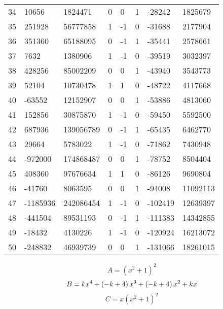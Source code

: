 \documentclass{amsart}
\begin{document}
\begin{longtable}{|l|l|l|lllll|}
34&10656&1824471&0&0&1&-28242&1825679\\
35&251928&56777858&1&-1&0&-31688&2177904\\
36&351360&65188095&0&-1&1&-35441&2578661\\
37&7632&1380906&1&-1&0&-39519&3032397\\
38&428256&85002209&0&0&1&-43940&3543773\\
39&52104&10730478&1&1&0&-48722&4117668\\
40&-63552&12152907&0&0&1&-53886&4813060\\
41&152856&30875870&1&-1&0&-59450&5592500\\
42&687936&139056789&0&-1&1&-65435&6462770\\
43&29664&5783022&1&-1&0&-71862&7430948\\
44&-972000&174868487&0&0&1&-78752&8504404\\
45&408360&97676634&1&1&0&-86126&9690804\\
46&-41760&8063595&0&0&1&-94008&11092113\\
47&-1185936&242086454&1&-1&0&-102419&12639397\\
48&-441504&89531193&0&-1&1&-111383&14342855\\
49&-18432&4130226&1&-1&0&-120924&16213072\\
50&-248832&46939739&0&0&1&-131066&18261015\\
\hline
\end{longtable}
$$A=(x^2
 + 1)^{2}$$
$$B=k\*x^4
 + \left(-k
 + 4\right) \*x^3
 + \left(-k
 + 4\right) \*x^2
 + k\*x$$
$$C=x(x^2
 + 1)^{2}$$
\end{document}
